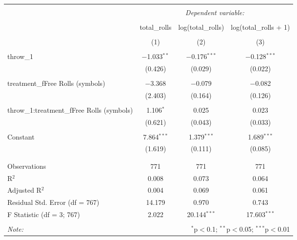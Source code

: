 
\begin{table}[!htbp] \centering 
  \caption{} 
  \label{} 
\begin{tabular}{@{\extracolsep{5pt}}lccc} 
\\[-1.8ex]\hline 
\hline \\[-1.8ex] 
 & \multicolumn{3}{c}{\textit{Dependent variable:}} \\ 
\cline{2-4} 
\\[-1.8ex] & total\_rolls & log(total\_rolls) & log(total\_rolls + 1) \\ 
\\[-1.8ex] & (1) & (2) & (3)\\ 
\hline \\[-1.8ex] 
 throw\_1 & $-$1.033$^{**}$ & $-$0.176$^{***}$ & $-$0.128$^{***}$ \\ 
  & (0.426) & (0.029) & (0.022) \\ 
  & & & \\ 
 treatment\_fFree Rolls (symbols) & $-$3.368 & $-$0.079 & $-$0.082 \\ 
  & (2.403) & (0.164) & (0.126) \\ 
  & & & \\ 
 throw\_1:treatment\_fFree Rolls (symbols) & 1.106$^{*}$ & 0.025 & 0.023 \\ 
  & (0.621) & (0.043) & (0.033) \\ 
  & & & \\ 
 Constant & 7.864$^{***}$ & 1.379$^{***}$ & 1.689$^{***}$ \\ 
  & (1.619) & (0.111) & (0.085) \\ 
  & & & \\ 
\hline \\[-1.8ex] 
Observations & 771 & 771 & 771 \\ 
R$^{2}$ & 0.008 & 0.073 & 0.064 \\ 
Adjusted R$^{2}$ & 0.004 & 0.069 & 0.061 \\ 
Residual Std. Error (df = 767) & 14.179 & 0.970 & 0.743 \\ 
F Statistic (df = 3; 767) & 2.022 & 20.144$^{***}$ & 17.603$^{***}$ \\ 
\hline 
\hline \\[-1.8ex] 
\textit{Note:}  & \multicolumn{3}{r}{$^{*}$p$<$0.1; $^{**}$p$<$0.05; $^{***}$p$<$0.01} \\ 
\end{tabular} 
\end{table} 
